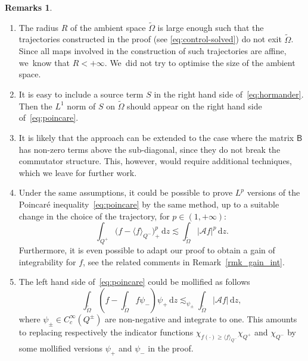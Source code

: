 \documentclass[10pt]{amsart}
\newcommand{\skpt}{\par\smallskip\noindent}
\theoremstyle{definition}
\newtheorem{remarks}[theorem]{Remarks}
\newcommand{\cA}{{\mathcal A}}
\newcommand{\sB}{{\mathsf B}}
\newcommand{\dd}{{\, \mathrm d}}
\begin{document}
\skpt
\begin{remarks}
\begin{enumerate}
\item The radius $R$ of the ambient space $\tilde \Omega$ is large enough
such that the trajectories constructed in the proof (see
\eqref{eq:control-solved}) do not exit $\tilde \Omega$. Since all maps
involved in the construction of such trajectories are affine, we~know that $R < +\infty$. We~did not try to optimise the size of the ambient space.

\item It is easy to include a source term $S$ in the right hand
side of~\eqref{eq:hormander}. Then the $L^1$ norm of $S$ on
$\tilde \Omega$ should appear on the right hand side
of~\eqref{eq:poincare}.

\item It is likely that the approach can be extended to the
case where the matrix $\sB$ has non-zero terms above the
sub-diagonal, since they do not break the commutator
structure. This, however, would require additional techniques,
which we leave for further work.

\item Under the same assumptions, it could be possible to
prove $L^p$ versions of the Poincaré
inequality~\eqref{eq:poincare} by the same method, up to a suitable change in the choice of the trajectory, for
$p \in (1, + \infty)$:
\begin{equation*}
\int_{Q^+} \big(f - \langle
f\rangle_{Q^-}\big)_+^p \dd z \lesssim
\int_{\tilde \Omega} \big\vert \cA f\big\vert^p \dd z.
\end{equation*}
Furthermore, it is even possible to adapt our proof to
obtain a gain of integrability for $f$, see the
related comments in Remark~\ref{rmk_gain_int}.

\item The left hand side of~\eqref{eq:poincare} could be
mollified as follows\vspace*{-3pt}\enlargethispage{.5\baselineskip}
\begin{equation}
\label{eq:moll-Poincare}
\int_{\tilde \Omega} \left(f - \int_{\tilde \Omega} f \psi_- \right) \psi_+
\dd z \lesssim_{\psi_\pm} \int_{\tilde \Omega} \big\vert \cA
f\big\vert\dd z,
\end{equation}
where $\psi_\pm \in C^\infty_c(Q^\pm)$ are non-negative and
integrate to one. This amounts to replacing respectively the
indicator functions
$\chi_{f(\cdot)\geq \langle f \rangle_{Q^-}} \chi_{Q^+}$ and
$\chi_{Q^-}$ by some mollified versions $\psi_+$ and $\psi_-$
in the proof.


\end{enumerate}
\end{remarks}
\end{document}
